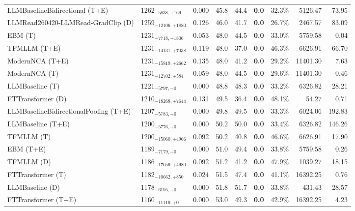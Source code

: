 \begin{tabular}{llcccccrr}
LLMBaselineBidirectional (T+E) & 1262${}_{-5838,+169}$ & 0.000 & 45.8 & 44.4 & \textcolor{bronze}{\textbf{0.0}} & 32.3\% & 5126.47 & 73.95 \\
LLMRead260420-LLMRead-GradClip (D) & 1259${}_{-12106,+1880}$ & 0.126 & 46.0 & 41.7 & \textcolor{bronze}{\textbf{0.0}} & 26.7\% & 2467.57 & 83.09 \\
EBM (T) & 1231${}_{-7718,+1806}$ & 0.053 & 48.0 & 44.5 & \textcolor{bronze}{\textbf{0.0}} & 33.0\% & 5759.58 & 0.04 \\
TFMLLM (T+E) & 1231${}_{-14131,+7038}$ & 0.119 & 48.0 & 37.0 & \textcolor{bronze}{\textbf{0.0}} & 46.3\% & 6626.91 & 66.70 \\
ModernNCA (T+E) & 1231${}_{-15819,+2662}$ & 0.135 & 48.0 & 41.2 & \textcolor{bronze}{\textbf{0.0}} & 29.2\% & 11401.30 & 7.63 \\
ModernNCA (T) & 1231${}_{-12702,+584}$ & 0.059 & 48.0 & 44.5 & \textcolor{bronze}{\textbf{0.0}} & 29.6\% & 11401.30 & 0.46 \\
LLMBaseline (T) & 1221${}_{-5797,+0}$ & 0.000 & 48.8 & 48.3 & \textcolor{bronze}{\textbf{0.0}} & 33.2\% & 6326.82 & 28.21 \\
FTTransformer (D) & 1210${}_{-18268,+7644}$ & 0.131 & 49.5 & 36.4 & \textcolor{bronze}{\textbf{0.0}} & 48.1\% & 54.27 & 0.71 \\
LLMBaselineBidirectionalPooling (T+E) & 1207${}_{-5783,+0}$ & 0.000 & 49.8 & 49.5 & \textcolor{bronze}{\textbf{0.0}} & 33.3\% & 6024.06 & 192.83 \\
LLMBaseline (T+E) & 1200${}_{-5776,+0}$ & 0.000 & 50.2 & 50.0 & \textcolor{bronze}{\textbf{0.0}} & 33.4\% & 6326.82 & 146.26 \\
TFMLLM (T) & 1200${}_{-15060,+4966}$ & 0.092 & 50.2 & 40.8 & \textcolor{bronze}{\textbf{0.0}} & 46.6\% & 6626.91 & 17.90 \\
EBM (T+E) & 1189${}_{-7179,+0}$ & 0.000 & 51.0 & 49.4 & \textcolor{bronze}{\textbf{0.0}} & 33.8\% & 5759.58 & 0.26 \\
TFMLLM (D) & 1186${}_{-17059,+4980}$ & 0.092 & 51.2 & 41.2 & \textcolor{bronze}{\textbf{0.0}} & 47.9\% & 1039.27 & 18.15 \\
FTTransformer (T) & 1182${}_{-10662,+850}$ & 0.024 & 51.5 & 47.4 & \textcolor{bronze}{\textbf{0.0}} & 41.1\% & 16392.25 & 0.76 \\
LLMBaseline (D) & 1178${}_{-6195,+0}$ & 0.000 & 51.8 & 51.7 & \textcolor{bronze}{\textbf{0.0}} & 33.8\% & 431.43 & 28.57 \\
FTTransformer (T+E) & 1160${}_{-11119,+0}$ & 0.000 & 53.0 & 49.3 & \textcolor{bronze}{\textbf{0.0}} & 42.9\% & 16392.25 & 4.23 \\

\end{tabular}
